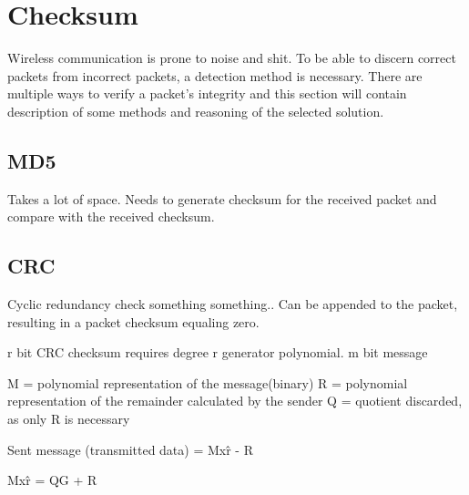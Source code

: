 \section{Checksum}
Wireless communication is prone to noise and shit. To be able to discern correct packets from incorrect packets, a detection method is necessary. There are multiple ways to verify a packet's integrity and this section will contain description of some methods and reasoning of the selected solution.

\subsection{MD5}
Takes a lot of space. Needs to generate checksum for the received packet and compare with the received checksum.

\subsection{CRC}
Cyclic redundancy check something something..
Can be appended to the packet, resulting in a packet checksum equaling zero.

r bit CRC checksum requires degree r generator polynomial.
m bit message

M = polynomial representation of the message(binary)
R = polynomial representation of the remainder calculated by the sender
Q = quotient discarded, as only R is necessary

Sent message (transmitted data) = Mx\^r - R

Mx\^r = QG + R